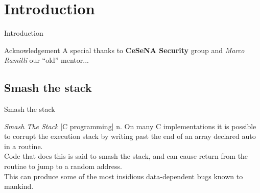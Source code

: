 \section{Introduction}
\begin{frame}{Introduction}
\begin{block}{Acknowledgement}
A special thanks to {\bf CeSeNA Security} group and \emph{Marco Ramilli} our ``old'' mentor...
\end{block}
\end{frame}

\subsection{Smash the stack}
\begin{frame}{Smash the stack}
\begin{block}{\emph{Smash The Stack} [C programming] n.}
On many C implementations it is possible to corrupt the execution stack by writing past the end of an array declared auto in a routine. \\Code that does this is said to smash the stack, and can cause return from the routine to jump to a random address. \\This can produce some of the most insidious data-dependent bugs known to mankind.
\end{block}
\end{frame}
